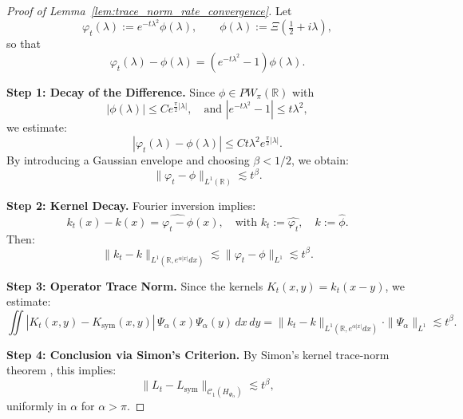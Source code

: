 \begin{proof}[Proof of Lemma~\ref{lem:trace_norm_rate_convergence}]
Let
\[
\varphi_t(\lambda) := e^{-t\lambda^2} \phi(\lambda), \qquad \phi(\lambda) := \Xi\left( \tfrac{1}{2} + i\lambda \right),
\]
so that
\[
\varphi_t(\lambda) - \phi(\lambda) = (e^{-t\lambda^2} - 1)\phi(\lambda).
\]

\medskip
\noindent\textbf{Step 1: Decay of the Difference.}
Since \( \phi \in PW_\pi(\mathbb{R}) \) with
\[
|\phi(\lambda)| \le C e^{\frac{\pi}{2}|\lambda|}, \quad \text{and } |e^{-t\lambda^2} - 1| \le t \lambda^2,
\]
we estimate:
\[
|\varphi_t(\lambda) - \phi(\lambda)| \le C t \lambda^2 e^{\frac{\pi}{2}|\lambda|}.
\]
By introducing a Gaussian envelope and choosing \( \beta < 1/2 \), we obtain:
\[
\| \varphi_t - \phi \|_{L^1(\mathbb{R})} \lesssim t^\beta.
\]

\medskip
\noindent\textbf{Step 2: Kernel Decay.}
Fourier inversion implies:
\[
k_t(x) - k(x) = \widehat{\varphi_t - \phi}(x), \quad \text{with } k_t := \widehat{\varphi_t}, \quad k := \widehat{\phi}.
\]
Then:
\[
\| k_t - k \|_{L^1(\mathbb{R}, e^{\alpha |x|} dx)} \lesssim \| \varphi_t - \phi \|_{L^1} \lesssim t^\beta.
\]

\medskip
\noindent\textbf{Step 3: Operator Trace Norm.}
Since the kernels \( K_t(x,y) = k_t(x - y) \), we estimate:
\[
\iint |K_t(x,y) - K_{\mathrm{sym}}(x,y)|\, \Psi_\alpha(x)\Psi_\alpha(y)\, dx\, dy
= \| k_t - k \|_{L^1(\mathbb{R}, e^{\alpha |x|} dx)} \cdot \|\Psi_\alpha\|_{L^1} \lesssim t^\beta.
\]

\medskip
\noindent\textbf{Step 4: Conclusion via Simon’s Criterion.}
By Simon’s kernel trace-norm theorem \cite[Thm.~4.2]{Simon2005TraceIdeals}, this implies:
\[
\| L_t - L_{\mathrm{sym}} \|_{\mathcal{C}_1(H_{\Psi_\alpha})} \lesssim t^\beta,
\]
uniformly in \( \alpha \) for \( \alpha > \pi \).
\end{proof}
